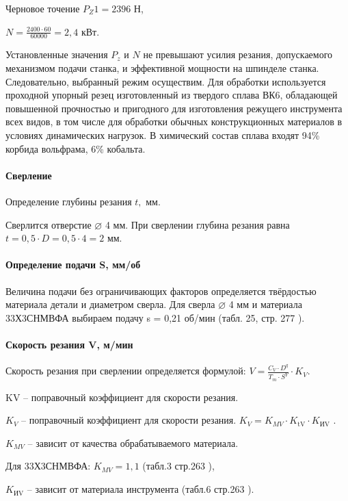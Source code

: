 Черновое точение $P_Z1 = 2396$  Н,

$ N = \frac{2400 \cdot 60} { 60000} = 2,4 $ кВт.

Установленные значения $P_z$ и $N$ не превышают усилия резания, допускаемого механизмом подачи станка, и эффективной мощности на шпинделе станка. Следовательно, выбранный режим осуществим.
Для обработки используется проходной упорный резец изготовленный из твердого сплава ВК6, обладающей повышенной прочностью и пригодного для изготовления режущего инструмента всех видов, в том числе для обработки обычных конструкционных материалов в условиях динамических нагрузок. В химический состав сплава входят 94\% корбида вольфрама, 6\% кобальта.

\paragraph{Сверление}

Определение глубины резания $t,$ мм.

Сверлится отверстие $\varnothing$  4 мм. При сверлении глубина резания равна $t = 0,5 \cdot D = 0,5 \cdot 4 = 2$ мм.

\paragraph{Определение подачи S, мм/об}

Величина подачи без ограничивающих факторов определяется твёрдостью материала детали и диаметром сверла. Для сверла $\varnothing$  4 мм и материала 33Х3СНМВФА выбираем подачу  s = 0,21 об/мин (табл. 25, стр. 277 \cite{TECHNO}).

\paragraph{Скорость резания V, м/мин}

Скорость резания при сверлении определяется формулой:  $ V = \frac { C_V \cdot D^q} { T_m \cdot S^Y} \cdot K_V$.

KV – поправочный коэффициент для скорости резания.

$K_V$ – поправочный коэффициент для скорости резания. $K_V = K_{MV} \cdot K_\text{tV} \cdot K_\text{ИV}$ .


$K_{MV}$  – зависит от качества обрабатываемого материала.

Для 33Х3СНМВФА: $K_{MV} = 1,1$    (табл.3 стр.263 \cite{TECHNO}),

$K_\text{ИV}$ – зависит от материала инструмента (табл.6 стр.263 \cite{TECHNO}).

